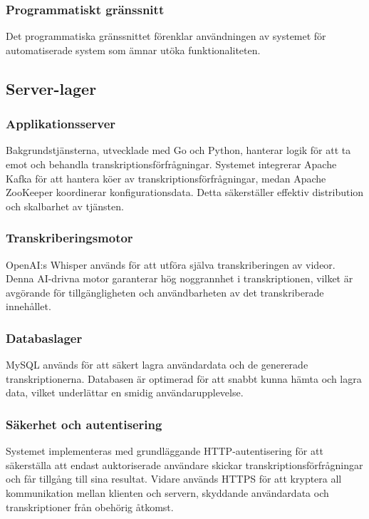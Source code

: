 \subsubsection{Programmatiskt gränssnitt}
Det programmatiska gränssnittet förenklar användningen av systemet för
automatiserade system som ämnar utöka funktionaliteten. 

\subsection{Server-lager}

\subsubsection{Applikationsserver}
Bakgrundstjänsterna, utvecklade med Go och Python, hanterar logik för att ta
emot och behandla transkriptionsförfrågningar. Systemet integrerar Apache
Kafka för att hantera köer av transkriptionsförfrågningar, medan Apache
ZooKeeper koordinerar konfigurationsdata. Detta säkerställer effektiv
distribution och skalbarhet av tjänsten.

\subsubsection{Transkriberingsmotor}
OpenAI:s Whisper används för att utföra själva transkriberingen av videor.
Denna AI-drivna motor garanterar hög noggrannhet i transkriptionen, vilket är
avgörande för tillgängligheten och användbarheten av det transkriberade
innehållet.

\subsubsection{Databaslager}
MySQL används för att säkert lagra användardata och de genererade
transkriptionerna. Databasen är optimerad för att snabbt kunna hämta och lagra
data, vilket underlättar en smidig användarupplevelse.

\subsubsection{Säkerhet och autentisering}
Systemet implementeras med grundläggande HTTP-autentisering för att säkerställa
att endast auktoriserade användare skickar transkriptionsförfrågningar och
får tillgång till sina resultat. Vidare används HTTPS för att kryptera all
kommunikation mellan klienten och servern, skyddande användardata och
transkriptioner från obehörig åtkomst.

